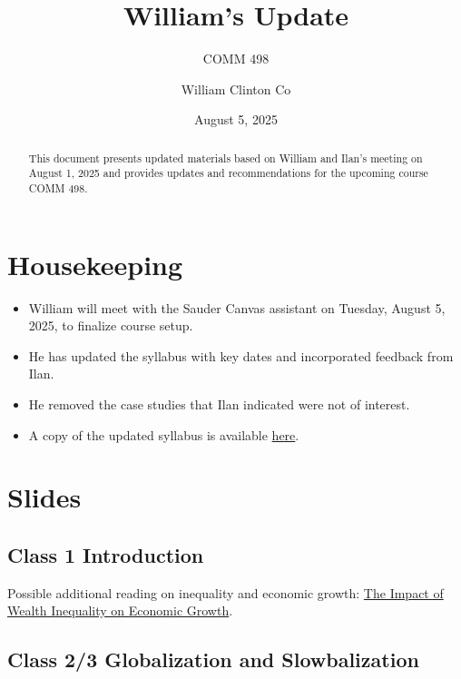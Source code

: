 \documentclass[
  11pt,
]{article}
\title{William's Update}
\subtitle{COMM 498}
\author{William Clinton Co}
\date{August 5, 2025}
\providecommand{\tightlist}{%
  \setlength{\itemsep}{0pt}\setlength{\parskip}{0pt}}
\renewcommand*\contentsname{Table of contents}
\newcommand\contentsname{Table of contents}
\begin{document}
\maketitle
\begin{abstract}
This document presents updated materials based on William and Ilan's
meeting on August 1, 2025 and provides updates and recommendations for
the upcoming course COMM 498.
\end{abstract}

\renewcommand*\contentsname{Table of contents}
{
\hypersetup{linkcolor=}
\setcounter{tocdepth}{3}
\tableofcontents
}

\section{Housekeeping}\label{housekeeping}

\begin{itemize}
\tightlist
\item
  William will meet with the Sauder Canvas assistant on Tuesday, August
  5, 2025, to finalize course setup.
\item
  He has updated the syllabus with key dates and incorporated feedback
  from Ilan.
\item
  He removed the case studies that Ilan indicated were not of interest.
\item
  A copy of the updated syllabus is available
  \href{https://github.com/WilliamClintC/Comm_498/blob/main/Slides/William_Update_Syllabus.docx}{here}.
\end{itemize}

\section{Slides}\label{slides}

\subsection{Class 1 Introduction}\label{class-1-introduction}

Possible additional reading on inequality and economic growth:
\href{https://cepr.org/voxeu/columns/impact-wealth-inequality-economic-growth-evidence-italy-during-its-structural}{The
Impact of Wealth Inequality on Economic Growth}.

\subsection{Class 2/3 Globalization and
Slowbalization}\label{class-23-globalization-and-slowbalization}
\end{document}
